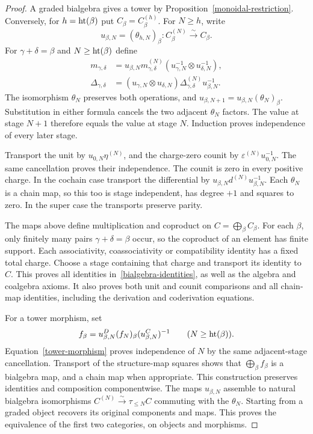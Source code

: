 \begin{proof}
A graded bialgebra gives a tower by Proposition~\ref{monoidal-restriction}.
Conversely, for $h=\operatorname{ht}(\beta)$ put $C_\beta=C^{(h)}_\beta$.
For $N\geq h$, write
\[
 u_{\beta,N}=(\theta_{h,N})_\beta:C^{(N)}_\beta
          \xrightarrow{\sim}C_\beta.
\]
For $\gamma+\delta=\beta$ and $N\geq\operatorname{ht}(\beta)$ define
\begin{align*}
 m_{\gamma,\delta}
 &=u_{\beta,N}m^{(N)}_{\gamma,\delta}
           (u_{\gamma,N}^{-1}\otimes u_{\delta,N}^{-1}),\\
 \Delta_{\gamma,\delta}
 &=(u_{\gamma,N}\otimes u_{\delta,N})
           \Delta^{(N)}_{\gamma,\delta}u_{\beta,N}^{-1}.
\end{align*}
The isomorphism $\theta_N$ preserves both operations, and
$u_{\beta,N+1}=u_{\beta,N}(\theta_N)_\beta$.
Substitution in either formula cancels the two adjacent $\theta_N$
factors.  The value at stage $N+1$ therefore equals the value at stage
$N$.  Induction proves independence of every later stage.

Transport the unit by $u_{0,N}\eta^{(N)}$, and the charge-zero counit by
$\varepsilon^{(N)}u_{0,N}^{-1}$.  The same cancellation proves their
independence.  The counit is zero in every positive charge.
In the cochain case transport the differential by
$u_{\beta,N}d^{(N)}u_{\beta,N}^{-1}$.  Each $\theta_N$ is a chain map,
so this too is stage independent, has degree $+1$ and squares to zero.
In the super case the transports preserve parity.

The maps above define multiplication and coproduct on
$C=\bigoplus_\beta C_\beta$.  For each $\beta$, only finitely many
pairs $\gamma+\delta=\beta$ occur, so the coproduct of an element has
finite support.  Each associativity, coassociativity or compatibility
identity has a fixed total charge.  Choose a stage containing that
charge and transport its identity to $C$.
This proves all identities in~\eqref{bialgebra-identities}, as well as
the algebra and coalgebra axioms.  It also proves both unit and counit
comparisons and all chain-map identities, including the derivation and
coderivation equations.

For a tower morphism, set
\[
 f_\beta=u^D_{\beta,N}(f_N)_\beta(u^C_{\beta,N})^{-1}
 \qquad(N\geq\operatorname{ht}(\beta)).
\]
Equation~\eqref{tower-morphism} proves independence of $N$ by the same
adjacent-stage cancellation.  Transport of the structure-map squares
shows that $\bigoplus_\beta f_\beta$ is a bialgebra map, and a chain map
when appropriate.  This construction preserves identities and
composition componentwise.  The maps $u_{\beta,N}$ assemble to natural
bialgebra isomorphisms
$C^{(N)}\xrightarrow{\sim}\tau_{\leq N}C$ commuting with the
$\theta_N$.  Starting from a graded object recovers its original
components and maps.  This proves the equivalence of the first two
categories, on objects and morphisms.


\end{proof}

